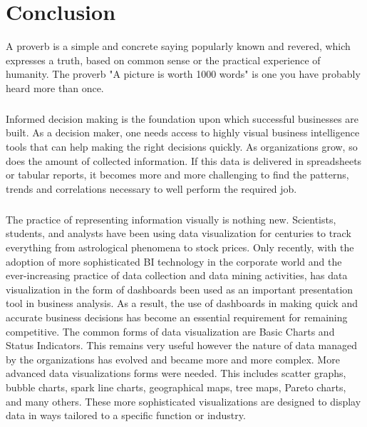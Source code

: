 \chapter*{Conclusion}
 \pagestyle{fancy}
 \thispagestyle{\renewcommand{\headrulewidth}{0pt}}
\rhead{}
\lhead{}
\lettrine[lines=2,lhang=0.44,lraise=0,loversize=0.08,findent=-0.11em,slope=0.6em]%
{A}{} proverb is a simple and concrete saying popularly known and revered, which expresses a truth, based on common sense or the practical experience of humanity. The proverb "A picture is worth 1000 words" is one you have probably heard more than once.
\paragraph*{}
Informed decision making is the foundation upon which successful businesses are built. As a decision maker, one needs access to highly visual business intelligence tools that can help making the right decisions quickly. As organizations grow, so does the amount of collected information. If this data is delivered in spreadsheets or tabular reports, it becomes more and more challenging to find the patterns, trends and correlations necessary to well perform the required job.
\paragraph*{}
The practice of representing information visually is nothing new. Scientists, students, and analysts have been using data visualization for centuries to track everything from astrological phenomena to stock prices. Only recently, with the adoption of more sophisticated BI technology in the corporate world and the ever-increasing practice of data collection and data mining activities, has data visualization in the form of dashboards been used as an important presentation tool in business analysis. As a result, the use of dashboards in making quick and accurate business decisions has become an essential requirement for remaining competitive. The common forms of data visualization are Basic Charts and Status Indicators. This remains very useful however the nature of data managed by the organizations has evolved and became more and more complex. More advanced data visualizations forms were needed. This includes scatter graphs, bubble charts, spark line charts, geographical maps, tree maps, Pareto charts, and many others. These more sophisticated visualizations are designed to display data in ways tailored to a specific function or industry.
